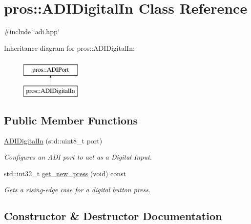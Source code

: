 \hypertarget{classpros_1_1ADIDigitalIn}{}\section{pros\+:\+:A\+D\+I\+Digital\+In Class Reference}
\label{classpros_1_1ADIDigitalIn}


{\ttfamily \#include \char`\"{}adi.\+hpp\char`\"{}}

Inheritance diagram for pros\+:\+:A\+D\+I\+Digital\+In\+:\begin{figure}[H]
\begin{center}
\leavevmode
\includegraphics[height=2.000000cm]{classpros_1_1ADIDigitalIn}
\end{center}
\end{figure}
\subsection*{Public Member Functions}
\begin{DoxyCompactItemize}
\item 
\hyperlink{classpros_1_1ADIDigitalIn_a08fd8f876b569084bf375ef59116e4f7}{A\+D\+I\+Digital\+In} (std\+::uint8\+\_\+t port)
\begin{DoxyCompactList}\small\item\em Configures an A\+DI port to act as a Digital Input. \end{DoxyCompactList}\item 
std\+::int32\+\_\+t \hyperlink{classpros_1_1ADIDigitalIn_a27d82a95e717eeee61ed6555952a93d8}{get\+\_\+new\+\_\+press} (void) const
\begin{DoxyCompactList}\small\item\em Gets a rising-\/edge case for a digital button press. \end{DoxyCompactList}\end{DoxyCompactItemize}


\subsection{Constructor \& Destructor Documentation}
\mbox{\label{classpros_1_1ADIDigitalIn_a08fd8f876b569084bf375ef59116e4f7}} 
